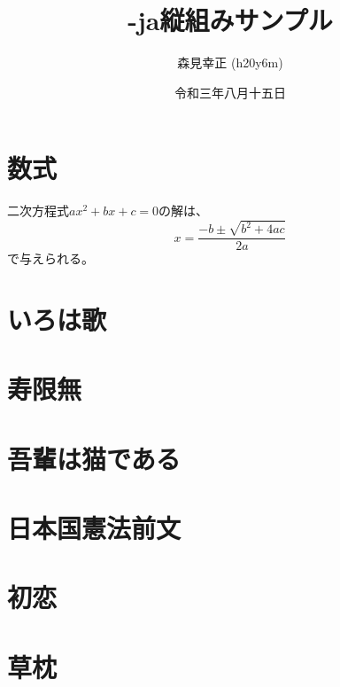 \documentclass[a4paper,twocolumn]{article}
\title{\XeLaTeX-ja縦組みサンプル}
\author{森見幸正 (h20y6m)}
\date{令和三年八月十五日}
\begin{document}
\maketitle

\section{数式}

二次方程式$ax^2+bx+c=0$の解は、
\[ x = \frac{-b\pm\sqrt{b^2+4ac}}{2a} \]
で与えられる。

\section{いろは歌}

\section{寿限無}

\section{吾輩は猫である}

\section{日本国憲法前文}

\section{初恋}

\section{草枕}
\end{document}

